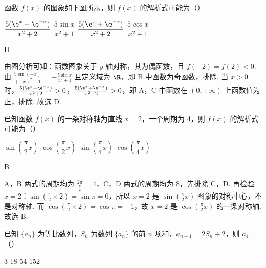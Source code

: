 \begin{problem}
函数 \(f(x)\) 的图象如下图所示，则 \(f(x)\) 的解析式可能为（\quad）


\choices
    {\(\dfrac{5(\e^x-\e^{-x})}{x^2+2}\)}
    {\(\dfrac{5\sin x}{x^2+1}\)}
    {\(\dfrac{5(\e^x+\e^{-x})}{x^2+2}\)}
    {\(\dfrac{5\cos x}{x^2+1}\)}
\end{problem}

\begin{answer}
D
\end{answer}

\begin{solution}
由图分析可知：函数图象关于 \(y\) 轴对称，其为偶函数，且 \(f(-2)=f(2)<0\). 由 \(\frac{5\sin(-x)}{(-x)^2+1}=-\frac{5\sin x}{x^2+1}\) 且定义域为 \(\R\)，即 B 中函数为奇函数，排除. 当 \(x>0\) 时，\(\frac{5(\e^x-\e^{-x})}{x^2+2}>0\)，\(\frac{5(\e^x+\e^{-x})}{x^2+2}>0\)，即 A，C 中函数在 \((0,+\infty)\) 上函数值为正，排除. 故选 D.
\end{solution}

\begin{problem}
已知函数 \(f(x)\) 的一条对称轴为直线 \(x=2\)，一个周期为 4，则 \(f(x)\) 的解析式可能为（\quad）

\choices
    {\(\sin \left( \dfrac{\pi}{2}x \right)\)}
    {\(\cos \left( \dfrac{\pi}{2}x \right)\)}
    {\(\sin \left( \dfrac{\pi}{4}x \right)\)}
    {\(\cos \left( \dfrac{\pi}{4}x \right)\)}
\end{problem}

\begin{answer}
B
\end{answer}

\begin{solution}
A，B 两式的周期均为 \(\frac{2\pi}{\frac{\pi}{2}}=4\)，C，D 两式的周期均为 8，先排除 C，D. 再检验 \(x=2\)：\(\sin \left( \frac{\pi}{2}\times 2 \right)=\sin \pi=0\)，所以 \(x=2\) 是 \(\sin \left( \frac{\pi}{2}x \right)\) 图象的对称中心，不是对称轴. 而 \(\cos \left( \frac{\pi}{2}\times 2 \right)=\cos \pi=-1\)，故 \(x=2\) 是 \(\cos \left( \frac{\pi}{2}x \right)\) 的一条对称轴. 故选 B.
\end{solution}

\begin{problem}
已知 \(\{a_n\}\) 为等比数列，\(S_n\) 为数列 \(\{a_n\}\) 的前 \(n\) 项和，\(a_{n+1}=2S_n+2\)，则 \(a_4=\)（\quad）

\choices
    {3}
    {18}
    {54}
    {152}
\end{problem}

